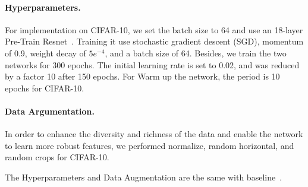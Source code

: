\documentclass[10pt,twocolumn,letterpaper]{article}
\begin{document}
\paragraph{Hyperparameters.}For implementation on CIFAR-10, we set the batch size to 64 and use an 18-layer Pre-Train Resnet~\cite{he2016identity}. Training it use stochastic gradient descent (SGD), momentum of 0.9, weight decay of $5e^{-4}$, and a batch size of 64. Besides, we train the two networks for 300 epochs. The initial learning rate is set to 0.02, and was reduced by a factor 10 after 150 epochs. For Warm up the network, the period is 10 epochs for CIFAR-10. 
\paragraph{Data Argumentation.}In order to enhance the diversity and richness of the data and enable the network to learn more robust features, we performed normalize, random horizontal, and random crops for CIFAR-10.

The Hyperparameters and Data Augmentation are the same with baseline~\cite{li2020dividemix}.

\begin{table}[!t]
\makeatletter
\centering
{}
\caption{Comparison with baseline method on CIFAR-10 mixed with various types and ratios of noise.}
\label{table:exp}
\end{table}
\end{document}
